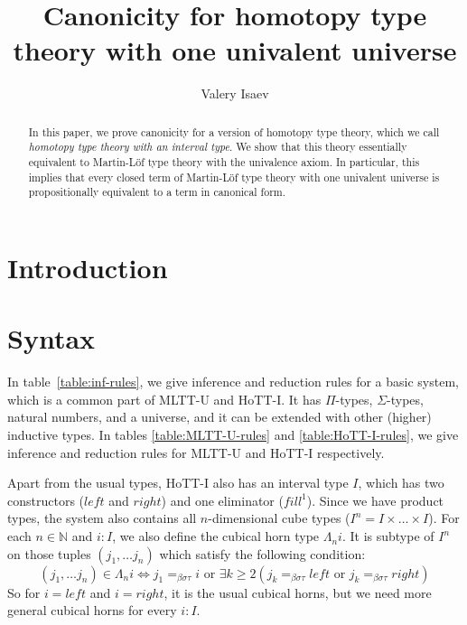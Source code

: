 \documentclass{amsart}
\theoremstyle{definition}
\theoremstyle{remark}
\newcommand{\bs}{\beta\sigma}
\newcommand{\bst}{\bs\tau}
\newcommand{\ebst}{=_{\bst}}
\numberwithin{figure}{section}
\begin{document}
\title{Canonicity for homotopy type theory with one univalent universe}

\author{Valery Isaev}

\begin{abstract}
In this paper, we prove canonicity for a version of homotopy type theory, which we call \emph{homotopy type theory with an interval type}.
We show that this theory essentially equivalent to Martin-L\"{o}f type theory with the univalence axiom.
In particular, this implies that every closed term of Martin-L\"{o}f type theory with one univalent universe is propositionally equivalent to a term in canonical form.
\end{abstract}

\maketitle

\section{Introduction}

\section{Syntax}

In table~\ref{table:inf-rules}, we give inference and reduction rules for a basic system, which is a common part of MLTT-U and HoTT-I.
It has $\Pi$-types, $\Sigma$-types, natural numbers, and a universe, and it can be extended with other (higher) inductive types.
In tables \ref{table:MLTT-U-rules} and \ref{table:HoTT-I-rules}, we give inference and reduction rules for MLTT-U and HoTT-I respectively.

Apart from the usual types, HoTT-I also has an interval type $I$, which has two constructors ($left$ and $right$) and one eliminator ($fill^1$).
Since we have product types, the system also contains all $n$-dimensional cube types ($I^n = I \times \ldots \times I$).
For each $n \in \mathbb{N}$ and $i : I$, we also define the cubical horn type $\Lambda_n i$.
It is subtype of $I^n$ on those tuples $(j_1, \ldots j_n)$ which satisfy the following condition:
\[ (j_1, \ldots j_n) \in \Lambda_n i \iff j_1 \ebst i \text{ or } \exists k \geq 2 (j_k \ebst left \text{ or } j_k \ebst right) \]
So for $i = left$ and $i = right$, it is the usual cubical horns, but we need more general cubical horns for every $i : I$.
\end{document}
